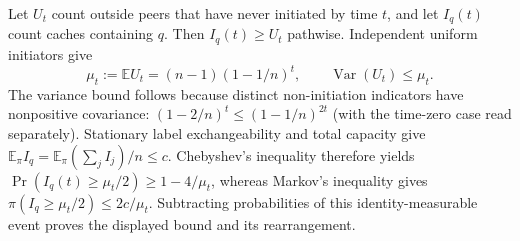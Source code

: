 \documentclass[11pt]{article}
\begin{document}
Let $U_t$ count outside peers that have never initiated by time $t$, and
let $I_q(t)$ count caches containing $q$. Then $I_q(t)\ge U_t$ pathwise.
Independent uniform initiators give
\[
 \mu_t:=\mathbb EU_t=(n-1)(1-1/n)^t,
 \qquad \operatorname{Var}(U_t)\le\mu_t.
\]
The variance bound follows because distinct non-initiation indicators have
nonpositive covariance:
$(1-2/n)^t\le(1-1/n)^{2t}$ (with the time-zero case read separately).
Stationary label exchangeability and total capacity give
$\mathbb E_\pi I_q=\mathbb E_\pi(\sum_j I_j)/n\le c$.
Chebyshev's inequality therefore yields
$\Pr(I_q(t)\ge\mu_t/2)\ge1-4/\mu_t$, whereas Markov's inequality gives
$\pi(I_q\ge\mu_t/2)\le2c/\mu_t$. Subtracting probabilities of this
identity-measurable event proves the displayed bound and its rearrangement.
\end{document}
